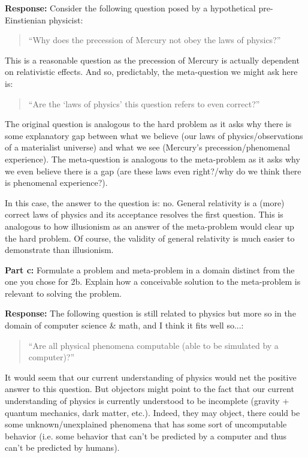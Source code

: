\documentclass{article}
\begin{document}
\noindent\textbf{Response:} Consider the following question posed by a hypothetical pre-Einstienian physicist:

\begin{quote}
    ``Why does the precession of Mercury not obey the laws of physics?''
\end{quote}

This is a reasonable question as the precession of Mercury is actually dependent on relativistic effects. And so, predictably, the meta-question we might ask here is:

\begin{quote}
    ``Are the `laws of physics' this question refers to even correct?''
\end{quote}

The original question is analogous to the hard problem as it asks why there is some explanatory gap between what we believe (our laws of physics/observations of a materialist universe) and what we see (Mercury's precession/phenomenal experience). The meta-question is analogous to the meta-problem as it asks why we even believe there is a gap (are these laws even right?/why do we think there is phenomenal experience?).

In this case, the answer to the question is: no. General relativity is a (more) correct laws of physics and its acceptance resolves the first question. This is analogous to how illusionism as an answer of the meta-problem would clear up the hard problem. Of course, the validity of general relativity is much easier to demonstrate than illusionism.
\bigskip

\noindent\textbf{Part c:} Formulate a problem and meta-problem in a domain distinct from the one you chose for 2b. Explain how a conceivable solution to the meta-problem is relevant to solving the problem.
\bigskip

\noindent\textbf{Response:} The following question is still related to physics but more so in the domain of computer science \& math, and I think it fits well so...:
\begin{quote}
    ``Are all physical phenomena computable (able to be simulated by a computer)?''
\end{quote}

It would seem that our current understanding of physics would net the positive answer to this question. But objectors might point to the fact that our current understanding of physics is currently understood to be incomplete (gravity + quantum mechanics, dark matter, etc.). Indeed, they may object, there could be some unknown/unexplained phenomena that has some sort of uncomputable behavior (i.e. some behavior that can't be predicted by a computer and thus can't be predicted by humans).
\end{document}
